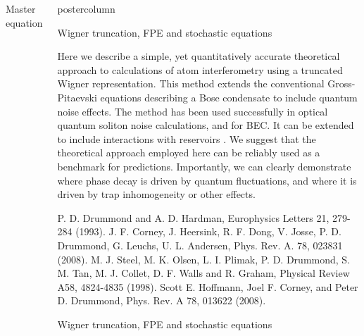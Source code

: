 \documentclass[final,hyperref={pdfpagelabels=false}]{beamer}
\newcommand{\mycolumn}[1]{
	\begin{column}{.5\textwidth}
	\begin{beamercolorbox}[center,wd=\textwidth]{postercolumn}
	\begin{minipage}[T]{.95\textwidth} %

	\parbox[t][\columnheight]{\textwidth}{ #1 }

	\end{minipage}
	\end{beamercolorbox}
	\end{column}
}
\newlength{\columnheight}
\begin{document}
\begin{frame}
\begin{columns}
{\begin{block}{Master equation}
\end{block}

} %

\mycolumn{

\begin{block}{Wigner truncation, FPE and stochastic equations}

Here we describe a simple, yet quantitatively accurate theoretical approach to calculations of atom interferometry
using a truncated Wigner representation.
This method extends the conventional Gross-Pitaevski equations describing a Bose condensate to include quantum noise effects.
The method has been used successfully in optical quantum soliton noise calculations\cite{Drummond,Corney},
and for BEC\cite{Steel}.
It can be extended to include interactions with reservoirs \cite{Hoffmann}.
We suggest that the theoretical approach employed here can be reliably used as a benchmark for predictions.
Importantly, we can clearly demonstrate where phase decay is driven by quantum fluctuations,
and where it is driven by trap inhomogeneity or other effects.

\tiny{ \begin{thebibliography}{9}
	\bibitem{Drummond}  P. D. Drummond and A. D. Hardman,  Europhysics Letters 21, 279-284 (1993).
	\bibitem{Corney}  J. F. Corney, J. Heersink, R. F. Dong, V. Josse, P. D. Drummond, G. Leuchs, U. L. Andersen, Phys. Rev. A. 78, 023831 (2008).
	\bibitem{Steel} M. J. Steel, M. K. Olsen, L. I. Plimak, P. D. Drummond, S. M. Tan, M. J. Collet, D. F. Walls and R. Graham, Physical Review A58, 4824-4835 (1998).
	\bibitem{Hoffmann} Scott E. Hoffmann, Joel F. Corney, and Peter D. Drummond, Phys. Rev. A 78, 013622 (2008).
\end{thebibliography} }

\end{block}
            
\begin{block}{Wigner truncation, FPE and stochastic equations}


\end{block}}
\end{columns}
\end{frame}
\end{document}

